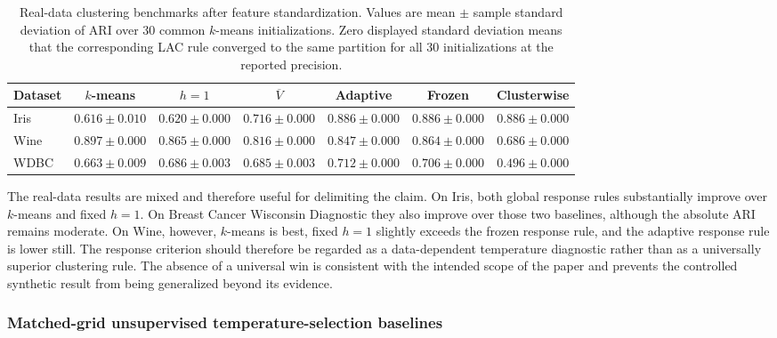 \documentclass[11pt,a4paper]{article}
\theoremstyle{definition}
\theoremstyle{plain}
\begin{document}
\begin{table}[htbp]
\centering
\begingroup
\renewcommand{\arraystretch}{1.38}
\setlength{\tabcolsep}{4.5pt}
\small
\caption{Real-data clustering benchmarks after feature standardization. Values are mean $\pm$ sample standard deviation of ARI over 30 common $k$-means initializations. Zero displayed standard deviation means that the corresponding LAC rule converged to the same partition for all 30 initializations at the reported precision.}
\label{tab:lac_real_benchmarks}
\scriptsize
\begin{tabular}{lcccccc}
\toprule
\textbf{Dataset} & \textbf{$k$-means} & \textbf{$h=1$} & \textbf{$\overline V$} & \textbf{Adaptive} & \textbf{Frozen} & \textbf{Clusterwise}\\
\midrule
Iris & $0.616\pm0.010$ & $0.620\pm0.000$ & $0.716\pm0.000$ & $0.886\pm0.000$ & $0.886\pm0.000$ & $0.886\pm0.000$\\
Wine & $0.897\pm0.000$ & $0.865\pm0.000$ & $0.816\pm0.000$ & $0.847\pm0.000$ & $0.864\pm0.000$ & $0.686\pm0.000$\\
WDBC & $0.663\pm0.009$ & $0.686\pm0.003$ & $0.685\pm0.003$ & $0.712\pm0.000$ & $0.706\pm0.000$ & $0.496\pm0.000$\\
\bottomrule
\end{tabular}
\endgroup
\end{table}

The real-data results are mixed and therefore useful for delimiting the claim. On Iris, both global response rules substantially improve over $k$-means and fixed $h=1$. On Breast Cancer Wisconsin Diagnostic they also improve over those two baselines, although the absolute ARI remains moderate. On Wine, however, $k$-means is best, fixed $h=1$ slightly exceeds the frozen response rule, and the adaptive response rule is lower still. The response criterion should therefore be regarded as a data-dependent temperature diagnostic rather than as a universally superior clustering rule. The absence of a universal win is consistent with the intended scope of the paper and prevents the controlled synthetic result from being generalized beyond its evidence.

\subsubsection{Matched-grid unsupervised temperature-selection baselines}
\label{subsubsec:h_baselines}
\end{document}
